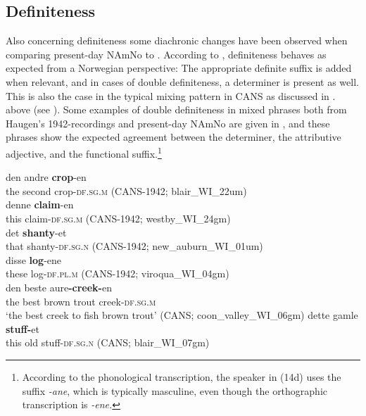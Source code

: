 \documentclass[output=paper]{langscibook}
\begin{document}
\subsection{Definiteness}\label{sec:riksem:5.2}

Also concerning definiteness some diachronic changes have been observed when comparing present-day NAmNo to \citet{Haugen1953}. According to \citet[451]{Haugen1953}, definiteness behaves as expected from a Norwegian perspective: The appropriate definite suffix is added when relevant, and in cases of double definiteness, a determiner is present as well. This is also the case in the typical mixing pattern in CANS as discussed in . above (see \citealt{Riksem2018Language}). Some examples of double definiteness in mixed phrases both from Haugen’s 1942-recordings and present-day NAmNo are given in , and these phrases show the expected agreement between the determiner, the attributive adjective, and the functional suffix.\footnote{ \textrm{According to the phonological transcription, the speaker in (14d) uses the suffix} \textrm{\textit{{}-ane}}\textrm{, which is typically masculine, even though the orthographic transcription is} \textrm{\textit{{}-ene.} }}

\ea\label{ex:riksem:23}
\ea 
\gll den andre \textbf{crop}{}-en\\
	the second crop-\textsc{df.sg.m} (CANS-1942; %
    blair\_WI\_22um)\\
\ex 
\gll denne \textbf{claim}{}-en\\
	 this claim-\textsc{df.sg.m} (CANS-1942; %
     westby\_WI\_24gm)\\
\ex 
\gll det \textbf{shanty}{}-et\\
	 that shanty-\textsc{df.sg.n} (CANS-1942; %
     new\_auburn\_WI\_01um)\\
\ex 
\gll disse \textbf{log}{}-ene\\
	these log-\textsc{df.pl.m} (CANS-1942; %
    viroqua\_WI\_04gm)\\
\ex 
\gll den beste aure\textbf{{}-creek-}en\\
	 the best  {brown trout creek}-\textsc{df.sg.m}\\
\glt `the best creek to fish brown trout’ (CANS; %
coon\_valley\_WI\_06gm)
\ex 
\gll dette gamle \textbf{stuff-}et\\
	 this      old     stuff-\textsc{df.sg.n} (CANS; %
     blair\_WI\_07gm)\\
\z
\z
\largerpage[2]
\end{document}
